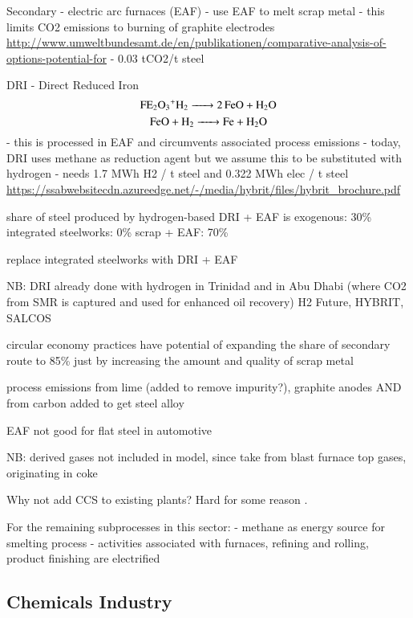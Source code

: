 Secondary - electric arc furnaces (EAF)
- use EAF to melt scrap metal
- this limits CO2 emissions to burning of graphite electrodes \url{http://www.umweltbundesamt.de/en/publikationen/comparative-analysis-of-options-potential-for}
- 0.03 tCO2/t steel

DRI - Direct Reduced Iron
\begin{equation}
    \ce{FE2O3+H2 -> 2FeO + H2O}
\end{equation}
\begin{equation}
    \ce{FeO + H2 -> Fe + H2O}
\end{equation}
- this is processed in EAF and circumvents associated process emissions
- today, DRI uses methane as reduction agent but we assume this to be substituted with hydrogen
- needs 1.7 MWh H2 / t steel  and 0.322 MWh elec / t steel \url{https://ssabwebsitecdn.azureedge.net/-/media/hybrit/files/hybrit_brochure.pdf}

share of steel produced by hydrogen-based DRI + EAF is exogenous: 30\%
integrated steelworks: 0\%
scrap + EAF: 70\%

replace integrated steelworks with DRI + EAF

NB: DRI already done with hydrogen in Trinidad and in Abu Dhabi (where CO2 from
SMR is captured and used for enhanced oil recovery) H2 Future, HYBRIT, SALCOS

 circular economy practices have potential of expanding
the share of secondary route to 85\% just by increasing the amount and quality of scrap metal

process emissions from lime (added to remove impurity?), graphite anodes AND
from carbon added to get steel alloy  

EAF not good for flat steel in automotive

NB: derived gases not included in model, since take from blast furnace top
gases, originating in coke

Why not add CCS to existing plants? Hard for some reason .

For the remaining subprocesses in this sector:
- methane as energy source for smelting process
- activities associated with furnaces, refining and rolling, product finishing are electrified

\subsection{Chemicals Industry}


